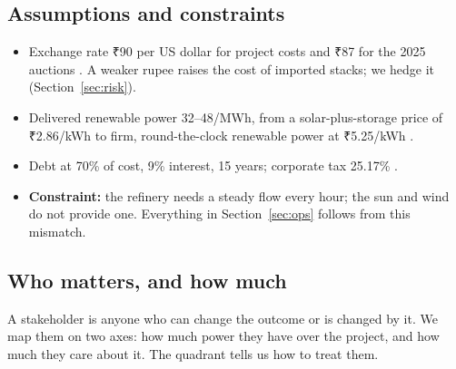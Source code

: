 \subsection{Assumptions and constraints}
\begin{itemize}
\item Exchange rate ₹90 per US dollar for project costs and ₹87 for the 2025 auctions \estd. A weaker rupee raises the cost of imported stacks; we hedge it (Section~\ref{sec:risk}).
\item Delivered renewable power \usd{}32--48/MWh, from a solar-plus-storage price of ₹2.86/kWh \cite{sqsolar2025} to firm, round-the-clock renewable power at ₹5.25/kWh \cite{pvmfdre2026} \rep.
\item Debt at 70\% of cost, 9\% interest, 15 years; corporate tax 25.17\% \estd.
\item \textbf{Constraint:} the refinery needs a steady flow every hour; the sun and wind do not provide one. Everything in Section~\ref{sec:ops} follows from this mismatch.
\end{itemize}

\subsection{Who matters, and how much}
A stakeholder is anyone who can change the outcome or is changed by it. We map them on two axes: how much power they have over the project, and how much they care about it. The quadrant tells us how to treat them.

